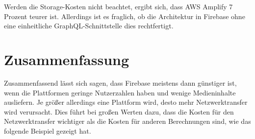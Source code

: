 Werden die Storage-Kosten nicht beachtet, ergibt sich, dass \ac{AWS} Amplify 7 Prozent teurer ist. Allerdings ist es fraglich, ob die Architektur in Firebase ohne eine einheitliche GraphQL-Schnittstelle dies rechtfertigt.

\section{Zusammenfassung}

Zusammenfassend lässt sich sagen, dass Firebase meistens dann günstiger ist, wenn die Plattformen geringe Nutzerzahlen haben und wenige Medieninhalte ausliefern. Je größer allerdings eine Plattform wird, desto mehr Netzwerktransfer wird verursacht. Dies führt bei großen Werten dazu, dass die Kosten für den Netzwerktransfer wichtiger als die Kosten für anderen Berechnungen sind, wie das folgende Beispiel gezeigt hat.